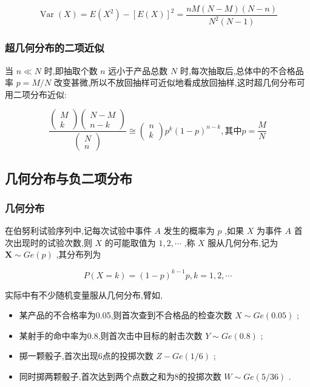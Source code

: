 \[
\operatorname{Var}(X)=E\left(X^{2}\right)-[E(X)]^{2}=\frac{n M(N-M)(N-n)}{N^{2}(N-1)}
\]

\subsubsection{超几何分布的二项近似}

当 $ n \ll N $ 时,即抽取个数 $ n $ 远小于产品总数 $ N $ 时,每次抽取后,总体中的不合格品率 $ p=M/N $ 改变甚微,所以不放回抽样可近似地看成放回抽样,这时超几何分布可用二项分布近似:

\begin{equation}
\frac{\left( 
	\begin{array}{c}
	{M} \\ 
	{k}
	\end{array}
	\right) \left( 
	\begin{array}{c}
	{N-M} \\ 
	{n-k}
	\end{array}
	\right)}{\left( 
	\begin{array}{l}
	{N} \\ 
	{n}
	\end{array}
	\right)} \cong \left( 
\begin{array}{l}
{n} \\ 
{k}
\end{array}
\right) p^{k}(1-p)^{n-k}, \text{其中} p=\frac{M}{N}  \label{eq:2.4.7}
\end{equation}

\subsection{几何分布与负二项分布}\label{ssec:2.4.4}

\subsubsection{几何分布}

在伯努利试验序列中,记每次试验中事件 $ A $ 发生的概率为 $ p $ ,如果 $ X $ 为事件 $ A $ 首次出现时的试验次数,则 $ X $ 的可能取值为 $ 1,2, \cdots $ ,称 $ X $ 服从几何分布,记为 $ \boldsymbol{X} \sim G e(p) $ ,其分布列为

\begin{equation}
P(X=k)=(1-p)^{k-1} p, k=1,2, \cdots \label{eq:2.4.8}
\end{equation}

实际中有不少随机变量服从几何分布,臂如,

\begin{itemize}
	\item 某产品的不合格率为0.05,则首次查到不合格品的检查次数 $ X \sim Ge(0.05) $ ;
	\item 某射手的命中率为0.8,则首次击中目标的射击次数 $ Y\sim Ge(0.8) $ ;
	\item 掷一颗骰子,首次出现6点的投掷次数 $ Z-G e(1 / 6) $ ;
	\item 同时掷两颗骰子,首次达到两个点数之和为8的投掷次数 $ W \sim G e(5 / 36) $ .
\end{itemize}

